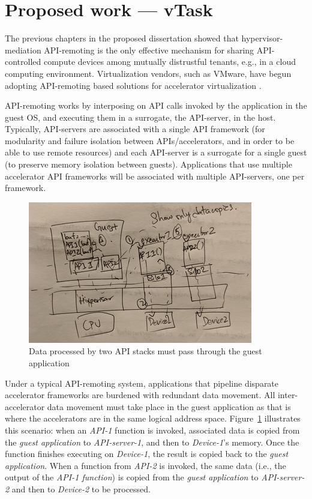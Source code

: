 \section{Proposed work --- vTask}
\label{sec:vTask}

The previous chapters in the proposed dissertation showed that
hypervisor-mediation API-remoting is the only effective mechanism for sharing
API-controlled compute devices among mutually distrustful tenants, e.g., in a
cloud computing environment. Virtualization vendors, such as VMware, have
begun adopting API-remoting based solutions for accelerator virtualization
.

API-remoting works by interposing on API calls invoked by the application in
the guest OS, and executing them in a surrogate, the API-server, in the host.
Typically, API-servers are associated with a single API framework (for
modularity and failure isolation between APIs/accelerators, and in order to be
able to use remote resources) and each API-server is a surrogate for a single
guest (to preserve memory isolation between guests). Applications that use
multiple accelerator API frameworks will be associated with multiple
API-servers, one per framework.

\begin{figure}[ht!]
\centering
\captionsetup{justification=centering,width=\linewidth}
\includegraphics[width=0.5\linewidth]{figures/overview.png}
\caption{Data processed by two API stacks must pass through the guest application}
\label{fig:overview}
\end{figure}

Under a typical API-remoting system, applications that pipeline disparate accelerator frameworks are burdened with redundant data movement. All inter-accelerator data movement must take place in the guest application as that is where the accelerators are in the same logical address space. Figure~\ref{fig:overview} illustrates this scenario: when an \emph{API-1} function is invoked, associated data is copied from the \emph{guest application} to \emph{API-server-1}, and then to \emph{Device-1}’s memory. Once the function finishes executing on \emph{Device-1}, the result is copied back to the \emph{guest application}. When a function from \emph{API-2} is invoked, the same data (i.e., the output of the \emph{API-1 function}) is copied from the \emph{guest application} to \emph{API-server-2} and then to \emph{Device-2} to be processed.

